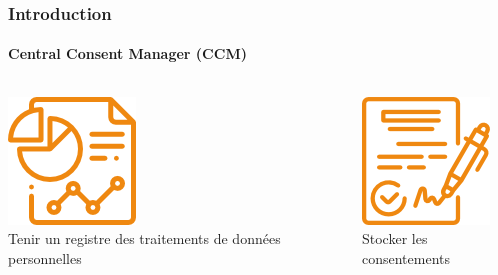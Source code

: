\documentclass[aspectratio=169]{beamer}
\begin{document}
\begin{frame}
    \frametitle{Introduction}
    \framesubtitle{Central Consent Manager (CCM)}
    \hfill
    \begin{center}
    \end{center}
    \begin{columns}
        \begin{column}{.45\textwidth}
            \parbox[c][0.5\textheight][c]{\columnwidth}{
                \begin{center}
                    \includegraphics[width=.2\textwidth]{processing.png}\\
                    Tenir un registre des traitements de données personnelles
                \end{center}
            }
        \end{column}
        \begin{column}{.45\textwidth}
            \parbox[c][0.5\textheight][c]{\columnwidth}{
                \begin{center}
                    \includegraphics[width=.2\textwidth]{consent.png}\\
                    Stocker les consentements
                \end{center}
            }
        \end{column}
    \end{columns}
\end{frame}
\end{document}
